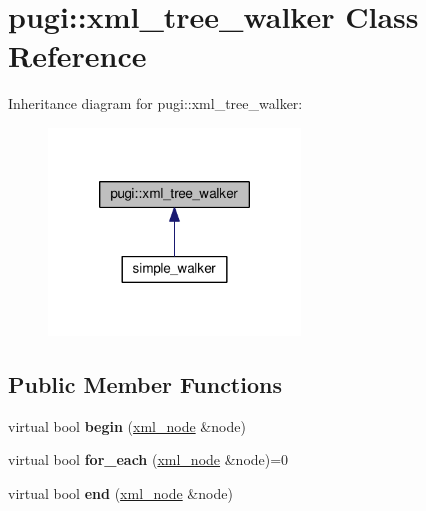 \hypertarget{classpugi_1_1xml__tree__walker}{\section{pugi\+:\+:xml\+\_\+tree\+\_\+walker Class Reference}
\label{classpugi_1_1xml__tree__walker}
}


Inheritance diagram for pugi\+:\+:xml\+\_\+tree\+\_\+walker\+:
\nopagebreak
\begin{figure}[H]
\begin{center}
\leavevmode
\includegraphics[width=190pt]{classpugi_1_1xml__tree__walker__inherit__graph}
\end{center}
\end{figure}
\subsection*{Public Member Functions}
\begin{DoxyCompactItemize}
\item 
\hypertarget{classpugi_1_1xml__tree__walker_a831cc2fc61a47e23673c85efc41bc7a2}{virtual bool {\bfseries begin} (\hyperlink{classpugi_1_1xml__node}{xml\+\_\+node} \&node)}\label{classpugi_1_1xml__tree__walker_a831cc2fc61a47e23673c85efc41bc7a2}

\item 
\hypertarget{classpugi_1_1xml__tree__walker_a309363c9d17ef3fc8cacc6f71fcbea88}{virtual bool {\bfseries for\+\_\+each} (\hyperlink{classpugi_1_1xml__node}{xml\+\_\+node} \&node)=0}\label{classpugi_1_1xml__tree__walker_a309363c9d17ef3fc8cacc6f71fcbea88}

\item 
\hypertarget{classpugi_1_1xml__tree__walker_a24e6ffd4a8351e2ee486440b6f784091}{virtual bool {\bfseries end} (\hyperlink{classpugi_1_1xml__node}{xml\+\_\+node} \&node)}\label{classpugi_1_1xml__tree__walker_a24e6ffd4a8351e2ee486440b6f784091}

\end{DoxyCompactItemize}
